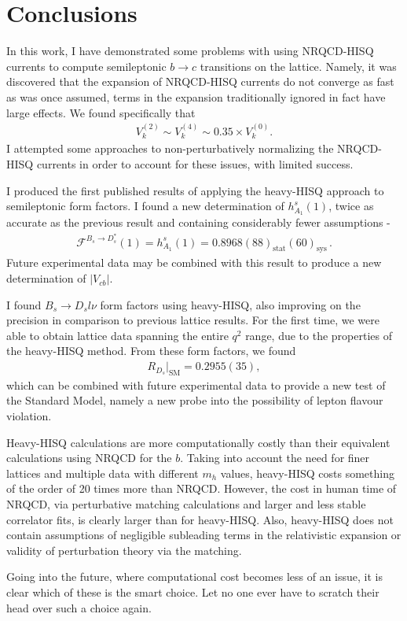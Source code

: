 ﻿\chapter{Conclusions}

In this work, I have demonstrated some problems with using NRQCD-HISQ currents to compute semileptonic $b\to c$ transitions on the lattice. Namely, it was discovered that the expansion of NRQCD-HISQ currents do not converge as fast as was once assumed, terms in the expansion traditionally ignored in fact have large effects. We found specifically that
\begin{align}
  V_k^{(2)}\sim V_k^{(4)} \sim 0.35\times V_k^{(0)}.
\end{align}
I attempted some approaches to non-perturbatively normalizing the NRQCD-HISQ currents in order to account for these issues, with limited success. 

I produced the first published results of applying the heavy-HISQ approach to semileptonic form factors. I found a new determination of $h_{A_1}^s(1)$, twice as accurate as the previous result and containing considerably fewer assumptions -
\begin{align}
  \mathcal{F}^{B_s\to D_s^*}(1) = h^s_{A_1}(1) = 0.8968(88)_{\text{stat}}(60)_{\text{sys}}\,.
\end{align}
Future experimental data may be combined with this result to produce a new determination of $|V_{cb}|$.

I found $B_s\to D_sl\nu$ form factors using heavy-HISQ, also improving on the precision in comparison to previous lattice results. For the first time, we were able to obtain lattice data spanning the entire $q^2$ range, due to the properties of the heavy-HISQ method. From these form factors, we found
\begin{align}
  R_{D_s}|_{\text{SM}} = 0.2955(35),
\end{align}
which can be combined with future experimental data to provide a new test of the Standard Model, namely a new probe into the possibility of lepton flavour violation.

Heavy-HISQ calculations are more computationally costly than their equivalent calculations using NRQCD for the $b$. Taking into account the need for finer lattices and multiple data with different $m_h$ values, heavy-HISQ costs something of the order of 20 times more than NRQCD. However, the cost in human time of NRQCD, via perturbative matching calculations and larger and less stable correlator fits, is clearly larger than for heavy-HISQ. Also, heavy-HISQ does not contain assumptions of negligible subleading terms in the relativistic expansion or validity of perturbation theory via the matching.

Going into the future, where computational cost becomes less of an issue, it is clear which of these is the smart choice. Let no one ever have to scratch their head over such a choice again.
